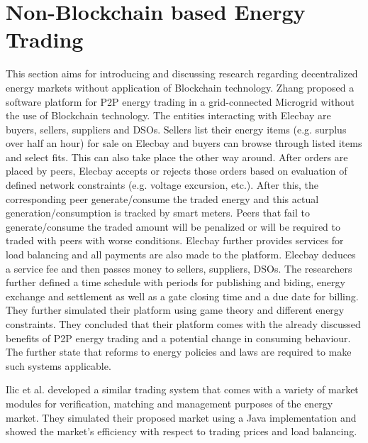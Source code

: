 \documentclass[runningheads]{llncs}
\begin{document}
\section{Non-Blockchain based Energy Trading}
This section aims for introducing and discussing research regarding decentralized energy markets without application of Blockchain technology.\newline
Zhang \cite{elecbay} proposed a software platform for P2P energy trading in a grid-connected Microgrid without the use of Blockchain technology. The entities interacting with Elecbay are buyers, sellers, suppliers and DSOs. Sellers list their energy items (e.g. surplus over half an hour) for sale on Elecbay and buyers can browse through listed items and select fits. This can also take place the other way around. After orders are placed by peers, Elecbay accepts or rejects those orders based on evaluation of defined network constraints (e.g. voltage excursion, etc.). After this, the corresponding peer generate/consume the traded energy and this actual generation/consumption is tracked by smart meters. Peers that fail to generate/consume the traded amount will be penalized or will be required to traded with peers with worse conditions. Elecbay further provides services for load balancing and all payments are also made to the platform. Elecbay deduces a service fee and then passes money to sellers, suppliers, DSOs. \newline
The researchers further defined a time schedule with periods for publishing and biding, energy exchange and settlement as well as a gate closing time and a due date for billing. They further simulated their platform using game theory and different energy constraints. They concluded that their platform comes with the already discussed benefits of P2P energy trading and a potential change in consuming behaviour. The further state that reforms to energy policies and laws are required to make such systems applicable. \cite{elecbay}

Ilic et al. \cite{ilic_smart_grid_neighbourhoods} developed a similar trading system that comes with a variety of market modules for verification, matching and management purposes of the energy market. They simulated their proposed market using a Java implementation and showed the market's efficiency with respect to trading prices and load balancing. 
\end{document}
